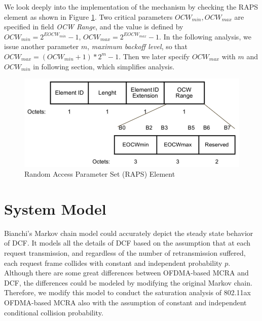 \documentclass[journal]{IEEEtran}
\begin{document}
We look deeply into the implementation of the mechanism by checking the RAPS element as shown in Figure \ref{fig_RAPS}.
Two critical parameters $OCW_{min},OCW_{max}$ are specified in field \textit{OCW Range}, and the value is defined by $OCW_{min} = 2^{EOCW_{min}}-1$, $OCW_{max} = 2^{EOCW_{max}}-1$. 
In the following analysis, we issue another parameter $m$, \textit{maximum backoff level}, so that $OCW_{max} = (OCW_{min}+1)*2^m-1$. 
Then we later specify $OCW_{max}$ with $m$ and $OCW_{min}$ in following section, which simplifies analysis.





\begin{figure}[!h]
\includegraphics[scale=0.3]{./figure/RAPS.png}
\caption{Random Access Parameter Set (RAPS) Element}
\label{fig_RAPS}
\end{figure}



\section{System Model} 		\label{sec_sys_model}
Bianchi's Markov chain model could accurately depict the steady state behavior of DCF. 
It models all the details of DCF based on the assumption that at each request transmission, and regardless of the number of retransmission suffered, each request frame collides with constant and independent probability $p$. 
Although there are some great differences between OFDMA-based MCRA and DCF, the differences could be modeled by modifying the original Markov chain.
Therefore, we modify this model to conduct the saturation analysis of 802.11ax OFDMA-based MCRA also with the assumption of constant and independent conditional collision probability.
\end{document}
